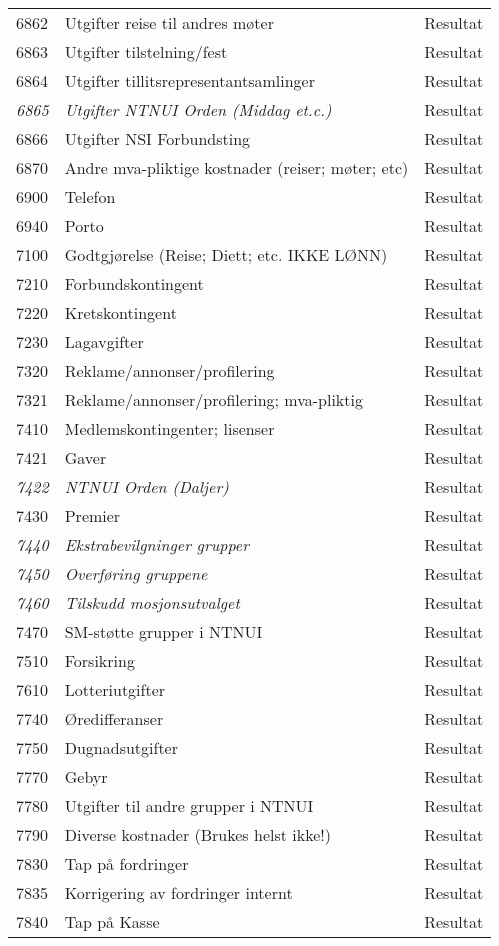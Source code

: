 \begin{table}[H]
\begin{tabular}{l l l }
6862 & Utgifter reise til andres møter & Resultat\\
6863 & Utgifter tilstelning/fest & Resultat\\
6864 & Utgifter tillitsrepresentantsamlinger & Resultat\\
\emph{6865} & \emph{Utgifter NTNUI Orden (Middag et.c.)} & Resultat\\
6866 & Utgifter NSI Forbundsting & Resultat\\
6870 & Andre mva-pliktige kostnader (reiser; møter; etc) & Resultat\\
6900 & Telefon & Resultat\\
6940 & Porto & Resultat\\

7100 & Godtgjørelse (Reise; Diett; etc. IKKE LØNN) & Resultat\\
7210 & Forbundskontingent & Resultat\\
7220 & Kretskontingent & Resultat\\
7230 & Lagavgifter & Resultat\\
7320 & Reklame/annonser/profilering & Resultat\\
7321 & Reklame/annonser/profilering; mva-pliktig & Resultat\\
7410 & Medlemskontingenter; lisenser & Resultat\\
7421 & Gaver & Resultat\\
\emph{7422} & \emph{NTNUI Orden (Daljer)} & Resultat\\
7430 & Premier & Resultat\\
\emph{7440} & \emph{Ekstrabevilgninger grupper} & Resultat\\
\emph{7450} & \emph{Overføring gruppene} & Resultat\\
\emph{7460} & \emph{Tilskudd mosjonsutvalget} & Resultat\\
7470 & SM-støtte grupper i NTNUI & Resultat\\
7510 & Forsikring & Resultat\\
7610 & Lotteriutgifter & Resultat\\
7740 & Øredifferanser & Resultat\\
7750 & Dugnadsutgifter & Resultat\\
7770 & Gebyr & Resultat\\
7780 & Utgifter til andre grupper i NTNUI & Resultat\\
7790 & Diverse kostnader (Brukes helst ikke!) & Resultat\\
7830 & Tap på fordringer & Resultat\\
7835 & Korrigering av fordringer internt & Resultat\\
7840 & Tap på Kasse & Resultat\\
	\end{tabular}
\end{table}
